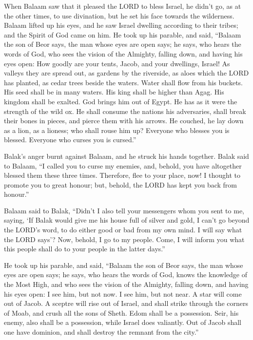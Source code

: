  When Balaam saw that it pleased the LORD to bless Israel,
he didn't go, as at the other times, to use divination, but he set his
face towards the wilderness.  Balaam lifted up his eyes,
and he saw Israel dwelling according to their tribes; and the Spirit of
God came on him.  He took up his parable, and said,
``Balaam the son of Beor says, the man whose eyes are open says;
 he says, who hears the words of God, who sees the vision
of the Almighty, falling down, and having his eyes open: 
How goodly are your tents, Jacob, and your dwellings, Israel!
 As valleys they are spread out, as gardens by the
riverside, as aloes which the LORD has planted, as cedar trees beside
the waters.  Water shall flow from his buckets. His seed
shall be in many waters. His king shall be higher than Agag. His kingdom
shall be exalted.  God brings him out of Egypt. He has as
it were the strength of the wild ox. He shall consume the nations his
adversaries, shall break their bones in pieces, and pierce them with his
arrows.  He couched, he lay down as a lion, as a lioness;
who shall rouse him up? Everyone who blesses you is blessed. Everyone
who curses you is cursed.''

 Balak's anger burnt against Balaam, and he struck his
hands together. Balak said to Balaam, ``I called you to curse my
enemies, and, behold, you have altogether blessed them these three
times.  Therefore, flee to your place, now! I thought to
promote you to great honour; but, behold, the LORD has kept you back
from honour.''

 Balaam said to Balak, ``Didn't I also tell your
messengers whom you sent to me, saying,  `If Balak would
give me his house full of silver and gold, I can't go beyond the LORD's
word, to do either good or bad from my own mind. I will say what the
LORD says'?  Now, behold, I go to my people. Come, I will
inform you what this people shall do to your people in the latter
days.''

 He took up his parable, and said, ``Balaam the son of
Beor says, the man whose eyes are open says;  he says,
who hears the words of God, knows the knowledge of the Most High, and
who sees the vision of the Almighty, falling down, and having his eyes
open:  I see him, but not now. I see him, but not near. A
star will come out of Jacob. A sceptre will rise out of Israel, and
shall strike through the corners of Moab, and crush all the sons of
Sheth.  Edom shall be a possession. Seir, his enemy, also
shall be a possession, while Israel does valiantly.  Out
of Jacob shall one have dominion, and shall destroy the remnant from the
city.''

